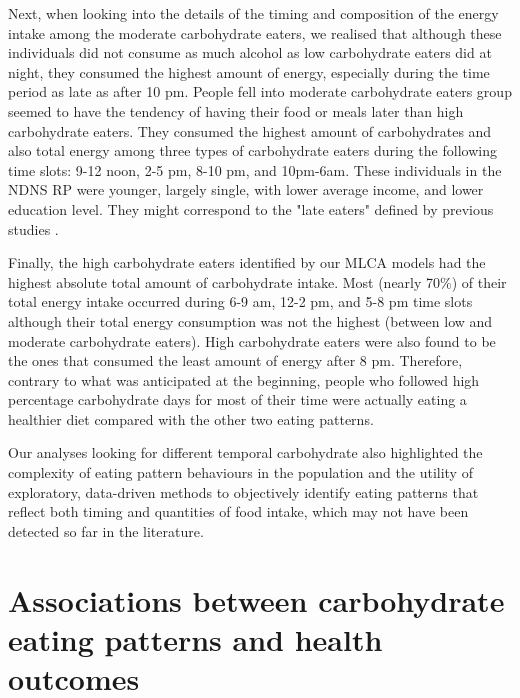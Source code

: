 Next, when looking into the details of the timing and composition of the energy intake among the moderate carbohydrate eaters, we realised that although these individuals did not consume as much alcohol as low carbohydrate eaters did at night, they consumed the highest amount of energy, especially during the time period as late as after 10 pm. People fell into moderate carbohydrate eaters group seemed to have the tendency of having their food or meals later than high carbohydrate eaters. They consumed the highest amount of carbohydrates and also total energy among three types of carbohydrate eaters during the following time slots: 9-12 noon, 2-5 pm, 8-10 pm, and 10pm-6am. These individuals in the NDNS RP were younger, largely single, with lower average income, and lower education level. They might correspond to the "late eaters" defined by previous studies \parencite{leech2017temporal, mansukhani2018investigating}. 

Finally, the high carbohydrate eaters identified by our MLCA models had the highest absolute total amount of carbohydrate intake. Most (nearly 70\%) of their total energy intake occurred during 6-9 am, 12-2 pm, and 5-8 pm time slots although their total energy consumption was not the highest (between low and moderate carbohydrate eaters). High carbohydrate eaters were also found to be the ones that consumed the least amount of energy after 8 pm. Therefore, contrary to what was anticipated at the beginning, people who followed high percentage carbohydrate days for most of their time were actually eating a healthier diet compared with the other two eating patterns. 

Our analyses looking for different temporal carbohydrate also highlighted the complexity of eating pattern behaviours in the population and the utility of exploratory, data-driven methods to objectively identify eating patterns that reflect both timing and quantities of food intake, which may not have been detected so far in the literature.


\section{Associations between carbohydrate eating patterns and health outcomes}

